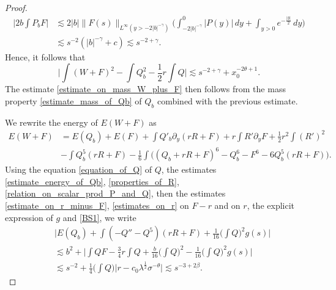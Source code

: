 \documentclass[16pt,english, oneside,reqno]{smfart}
\begin{document}
\begin{proof}
\begin{equation}
\begin{split}
        \bigg\lvert 2b\int P_b F \bigg\rvert 
        & \lesssim 2|b|\| F(s)\|_{L^{\infty}(y>-2|b|^{-\gamma})} \Big( \int^{0}_{-2|b|^{-\gamma}} |P(y)|\,dy + \int_{y>0}e^{-\frac{|y|}{2}}\, dy \Big) \\
        & \lesssim
        s^{-2}(|b|^{-\gamma} + c) \lesssim s^{-2+\gamma}.
    \end{split}
    \end{equation}
    Hence, it follows that
    \begin{equation}
        \bigg\lvert \int (W+F)^2 - \int Q^2_b - \frac{1}{2}r \int Q \bigg\rvert \lesssim s^{-2+\gamma}+x^{-2\theta+1}_0.
    \end{equation}
    The estimate \eqref{estimate_on_mass_W_plus_F} then follows from the mass property \eqref{estimate_mass_of_Qb} of $Q_b$ combined with the previous estimate.

    \vspace{0.4cm}
    We rewrite the energy of $E(W+F)$ as
    \begin{equation}
    \begin{split}
        E(W+F) 
        & = E(Q_b) + E(F) + \int Q'_b\partial_y(rR+F) + r\int R' \partial_yF + \frac{1}{2}r^2\int (R')^2\\
        & - \int Q^5_b (rR+F) - \frac{1}{6}\int \Big((Q_b+rR+F)^6 - Q^6_b - F^6 - 6Q^5_b (rR+F)  \Big).
    \end{split}
    \end{equation}
    Using the equation \eqref{equation_of_Q} of $Q$, the estimates \eqref{estimate_energy_of_Qb}, \eqref{properties_of_R}, \eqref{relation_on_scalar_prod_P_and_Q}, then the estimates \eqref{estimate_on_r_minus_F}, \eqref{estimates_on_r} on $F-r$ and on $r$, the explicit expression of $g$ and \eqref{BS1}, we write
    \begin{equation}
    \begin{split}
        & \Big\lvert E(Q_b) + \int (-Q''-Q^5)(rR+F) + \frac{1}{16}\Big(\int Q\Big)^2 g(s) \Big\rvert \\
        & \lesssim b^2 + \Big\lvert \int QF - \frac{3}{4}r\int Q + \frac{b}{16}\Big(\int Q\Big)^2 - \frac{1}{16}\Big(\int Q \Big)^2 g(s)\Big\rvert\\
        & \lesssim s^{-2} + \frac{1}{4}\Big(\int Q\Big)\Big\lvert r - c_0 \lambda^{\frac{1}{2}}\sigma^{-\theta}\Big\rvert \lesssim s^{-3+2\beta}.
    \end{split}
    \end{equation}
    

\end{proof}
\end{document}

